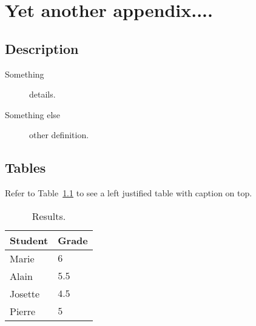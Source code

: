 \chapter{Yet another appendix....}

\section{Description}
\begin{description}
\item[Something] details.
\item[Something else] other definition.
\end{description}

\section{Tables}
Refer to Table~\ref{tab:example} to see a left justified table with caption
on top.

\begin{table}[ht]
\centering
\caption[Test results]{\label{tab:example}Results.}
\begin{tabular}{ll}
\hline
\textbf{Student} & \textbf{Grade}\\
\hline
Marie  & $6$\\
Alain  & $5.5$\\
Josette  & $4.5$\\
Pierre  & $5$\\
\hline
\end{tabular}
\end{table}
